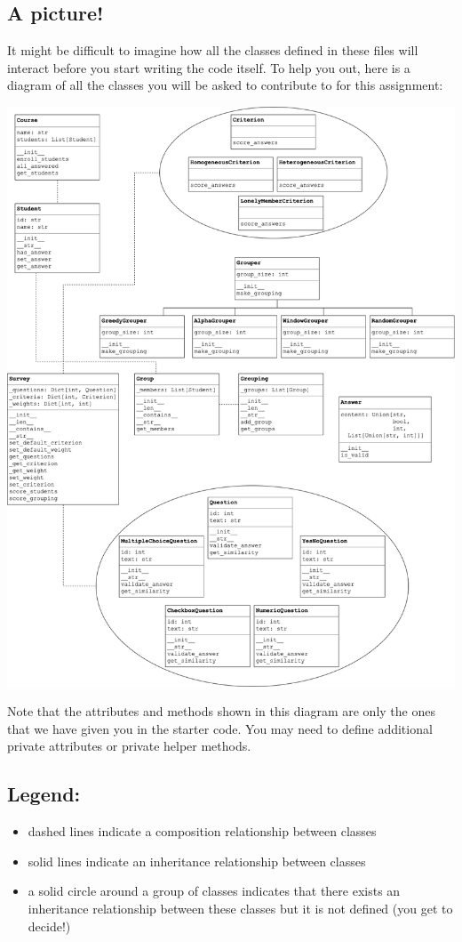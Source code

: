 \documentclass[12pt]{article}
\begin{document}
\bigskip

\subsection*{A picture!}

\noindent It might be difficult to imagine how all the classes defined in these files will
interact before you start writing the code itself. To help you out, here is a
diagram of all the classes you will be asked to contribute to for this assignment:

\begin{center}
    \includegraphics[width=0.8 \linewidth]{images/assignment_1/image_1.png}
\end{center}

\noindent Note that the attributes and methods shown in this diagram are only the ones
that we have given you in the starter code. You may need to define additional
private attributes or private helper methods.

\subsection*{Legend:}

\begin{itemize}
    \item dashed lines indicate a composition relationship between classes
    \item solid lines indicate an inheritance relationship between classes
    \item a solid circle around a group of classes indicates that there exists an inheritance relationship between these classes but it is not defined (you get to decide!)
\end{itemize}
\end{document}
